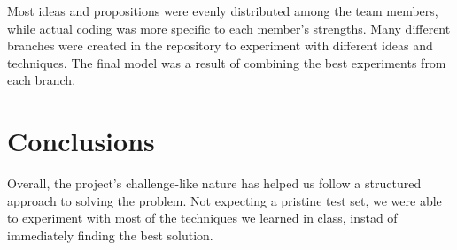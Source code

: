 \documentclass[11pt]{article}
\begin{document}
\begin{multicols}{2}
      Most ideas and propositions were evenly distributed among the team
      members, while actual coding was more specific to each member's
      strengths. Many different branches were created in the repository to
      experiment with different ideas and techniques. The final model was a
      result of combining the best experiments from each branch.

      \section{Conclusions}

      Overall, the project's challenge-like nature has helped us follow a
      structured approach to solving the problem. Not expecting a pristine test
      set, we were able to experiment with most of the techniques we learned in
      class, instad of immediately finding the best solution.

      
      

\end{multicols}
\end{document}
